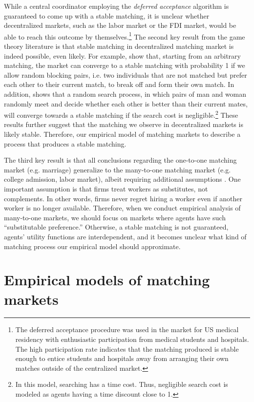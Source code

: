 While a central coordinator employing the \textit{deferred acceptance} algorithm
is guaranteed to come up with a stable matching, it is unclear whether
decentralized markets, such as the labor market or the FDI market, would be able
to reach this outcome by themselves.\footnote{The deferred acceptance procedure
  was used in the market for US medical residency with enthusiastic
  participation from medical students and hospitals. The high participation rate
  indicates that the matching produced is stable enough to entice students and
  hospitals away from arranging their own matches outside of the centralized
  market.} The second key result from the game theory literature is that stable
matching in decentralized matching market is indeed possible, even likely. For
example, \citet{Roth2016} show that, starting from an arbitrary matching, the
market can converge to a stable matching with probability 1 if we allow random
blocking pairs, i.e. two individuals that are not matched but prefer each other
to their current match, to break off and form their own match. In addition,
\citet{Adachi2003} shows that a random search process, in which pairs of man and
woman randomly meet and decide whether each other is better than their current
mates, will converge towards a stable matching if the search cost is
negligible.\footnote{In this model, searching has a time cost. Thus, negligible
  search cost is modeled as agents having a time discount close to 1.} These
results further suggest that the matching we observe in decentralized markets is
likely stable. Therefore, our empirical model of matching markets to describe a
process that produces a stable matching.

The third key result is that all conclusions regarding the one-to-one matching
market (e.g. marriage) generalize to the many-to-one matching market (e.g.
college admission, labor market), albeit requiring additional assumptions
\citet{Roth1992}. One important assumption is that firms treat workers as
substitutes, not complements. In other words, firms never regret hiring a worker
even if another worker is no longer available. Therefore, when we conduct
empirical analysis of many-to-one markets, we should focus on markets where
agents have such ``substitutable preference.'' Otherwise, a stable matching is
not guaranteed, agents' utility functions are interdependent, and it becomes
unclear what kind of matching process our empirical model should approximate.

\section{Empirical models of matching markets}

